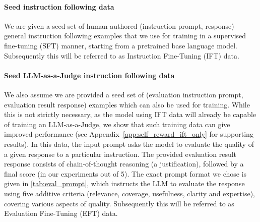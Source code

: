 \documentclass{article}
\begin{document}
\paragraph{Seed instruction following data} We are given a seed set of human-authored 
(instruction prompt, response) general instruction following examples that we use for training in a supervised fine-tuning (SFT) manner, starting from a pretrained base language model. Subsequently this will be referred to as Instruction
Fine-Tuning (IFT) data.

\paragraph{Seed LLM-as-a-Judge instruction following data}
We also assume we are provided a seed set of (evaluation instruction prompt, evaluation result response) examples which can also be used for training. 
While this is not strictly necessary, as the model using IFT data will already be capable of training an LLM-as-a-Judge,  we show that such training data can give 
improved performance (see Appendix~\ref{app:self_reward_ift_only} for supporting results). %
In this data, the input prompt asks the model to evaluate the quality of a given response to a particular instruction. The provided evaluation result response consists of chain-of-thought reasoning (a justification), followed by a final score (in our experiments out of 5). The exact prompt format we chose is given  in \autoref{tab:eval_prompt}, which  instructs the LLM to evaluate the response using five additive criteria (relevance, coverage, usefulness, clarity and expertise), covering various aspects of quality. 
Subsequently this will be referred to as Evaluation Fine-Tuning (EFT) data.



\end{document}
